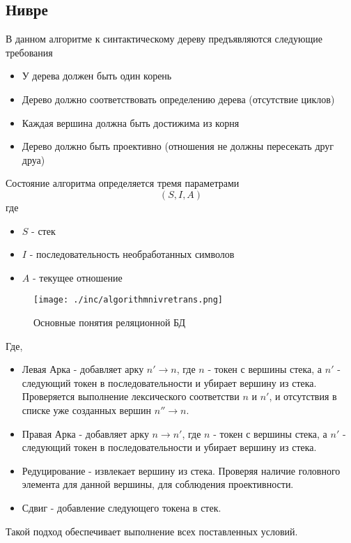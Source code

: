 \subsection{Нивре}
В данном алгоритме к синтактическому дереву предъявляются следующие требования 
\begin{itemize}
\item У дерева должен быть один корень
\item Дерево должно соответствовать определению дерева (отсутствие циклов)
\item Каждая вершина должна быть достижима из корня
\item Дерево должно быть проективно (отношения не должны пересекать друг друа)
\end{itemize}
Состояние алгоритма определяется тремя параметрами $$(S,I,A)$$
где 
\begin{itemize}
\item $S$ - стек
\item $I$ - последовательность необработанных символов
\item $A$ - текущее отношение
\end{itemize}
\begin{center}
\begin{figure}
  \centering
  \texttt{[image: ./inc/algorithmnivretrans.png]}
  \caption{Основные понятия реляционной БД}
  \label{fig:fig01}
\end{figure}
\end{center}
Где,
\begin{itemize}
\item Левая Арка - добавляет арку $n'\rightarrow n$, где $n$ - токен с вершины стека, а $n'$ - следующий токен в последовательности и убирает вершину из стека. Проверяется выполнение лексического соответстви $n$ и $n'$, и отсутствия в списке уже созданных вершин $n'' \rightarrow n$.
\item Правая Арка - добавляет арку $n\rightarrow n'$, где $n$ - токен с вершины стека, а $n'$ - следующий токен в последовательности и убирает вершину из стека.
\item Редуцирование - извлекает вершину из стека. Проверяя наличие головного элемента для данной вершины, для соблюдения проективности.
\item Сдвиг - добавление следующего токена в стек.
\end{itemize}
Такой подход обеспечивает выполнение всех поставленных условий.
\cite{Nivre}
